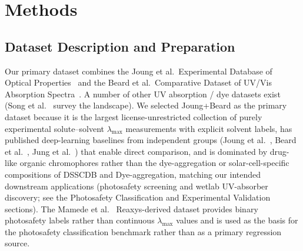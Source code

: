 \documentclass[journal=jcisd8,manuscript=article]{achemso}
\newcommand{\added}[1]{{\color{addedblue}#1}}
\begin{document}
\section{Methods}
\label{sec:methods}

\subsection{Dataset Description and Preparation}
\label{sec:dataset}

Our primary dataset combines the Joung et al.\ Experimental Database of Optical Properties~\cite{joung2020experimental} and the Beard et al.\ Comparative Dataset of UV/Vis Absorption Spectra~\cite{beard2019comparative}.
\added{A number of other UV absorption / dye datasets exist (Song et al.~\cite{song2025fluortools} survey the landscape). We selected Joung+Beard as the primary dataset because it is the largest license-unrestricted collection of purely experimental solute--solvent $\lambda_{\max}$ measurements with explicit solvent labels, has published deep-learning baselines from independent groups (Joung et al.~\cite{joung2021deep}, Beard et al.~\cite{beard2019comparative}, Jung et al.~\cite{jung2024machine}) that enable direct comparison, and is dominated by drug-like organic chromophores rather than the dye-aggregation or solar-cell-specific compositions of DSSCDB and Dye-aggregation, matching our intended downstream applications (photosafety screening and wetlab UV-absorber discovery; see the Photosafety Classification and Experimental Validation sections). The Mamede et al.~\cite{mamede2021machine} Reaxys-derived dataset provides binary photosafety labels rather than continuous $\lambda_{\max}$ values and is used as the basis for the photosafety classification benchmark rather than as a primary regression source.}
\end{document}
